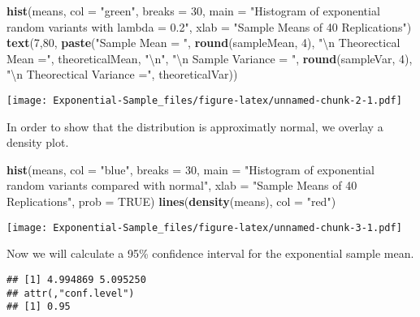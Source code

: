 \documentclass[
]{article}
\newenvironment{Shaded}{\begin{snugshade}}{\end{snugshade}}
\newcommand{\CharTok}[1]{\textcolor[rgb]{0.31,0.60,0.02}{#1}}
\newcommand{\DataTypeTok}[1]{\textcolor[rgb]{0.13,0.29,0.53}{#1}}
\newcommand{\DecValTok}[1]{\textcolor[rgb]{0.00,0.00,0.81}{#1}}
\newcommand{\KeywordTok}[1]{\textcolor[rgb]{0.13,0.29,0.53}{\textbf{#1}}}
\newcommand{\NormalTok}[1]{#1}
\newcommand{\OperatorTok}[1]{\textcolor[rgb]{0.81,0.36,0.00}{\textbf{#1}}}
\newcommand{\OtherTok}[1]{\textcolor[rgb]{0.56,0.35,0.01}{#1}}
\newcommand{\StringTok}[1]{\textcolor[rgb]{0.31,0.60,0.02}{#1}}
\begin{document}
\begin{Shaded}
\begin{Highlighting}[]
\KeywordTok{hist}\NormalTok{(means, }\DataTypeTok{col =} \StringTok{"green"}\NormalTok{, }\DataTypeTok{breaks =} \DecValTok{30}\NormalTok{, }\DataTypeTok{main =} \StringTok{"Histogram of exponential random variants with lambda = 0.2"}\NormalTok{, }\DataTypeTok{xlab =} \StringTok{"Sample Means of 40 Replications"}\NormalTok{)}
\KeywordTok{text}\NormalTok{(}\DecValTok{7}\NormalTok{,}\DecValTok{80}\NormalTok{, }\KeywordTok{paste}\NormalTok{(}\StringTok{"Sample Mean = "}\NormalTok{, }\KeywordTok{round}\NormalTok{(sampleMean, }\DecValTok{4}\NormalTok{), }\StringTok{"}\CharTok{\textbackslash{}n}\StringTok{ Theorectical Mean ="}\NormalTok{, theoreticalMean, }\StringTok{"}\CharTok{\textbackslash{}n}\StringTok{"}\NormalTok{, }\StringTok{"}\CharTok{\textbackslash{}n}\StringTok{ Sample Variance = "}\NormalTok{, }\KeywordTok{round}\NormalTok{(sampleVar, }\DecValTok{4}\NormalTok{), }\StringTok{"}\CharTok{\textbackslash{}n}\StringTok{ Theorectical Variance ="}\NormalTok{, theoreticalVar))}
\end{Highlighting}
\end{Shaded}

\texttt{[image: Exponential-Sample\_files/figure-latex/unnamed-chunk-2-1.pdf]}

In order to show that the distribution is approximatly normal, we
overlay a density plot.

\begin{Shaded}
\begin{Highlighting}[]
\KeywordTok{hist}\NormalTok{(means, }\DataTypeTok{col =} \StringTok{"blue"}\NormalTok{, }\DataTypeTok{breaks =} \DecValTok{30}\NormalTok{, }\DataTypeTok{main =} \StringTok{"Histogram of exponential random variants compared with normal"}\NormalTok{, }\DataTypeTok{xlab =} \StringTok{"Sample Means of 40 Replications"}\NormalTok{, }\DataTypeTok{prob =} \OtherTok{TRUE}\NormalTok{)}
\KeywordTok{lines}\NormalTok{(}\KeywordTok{density}\NormalTok{(means), }\DataTypeTok{col =} \StringTok{"red"}\NormalTok{)}
\end{Highlighting}
\end{Shaded}

\texttt{[image: Exponential-Sample\_files/figure-latex/unnamed-chunk-3-1.pdf]}

Now we will calculate a 95\% confidence interval for the exponential
sample mean.

\begin{Shaded}
\end{Shaded}

\begin{verbatim}
## [1] 4.994869 5.095250
## attr(,"conf.level")
## [1] 0.95
\end{verbatim}
\end{document}
